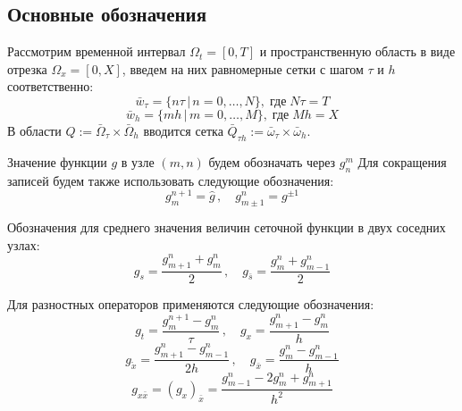 \subsection{Основные обозначения}
Рассмотрим временной интервал $\Omega_t = [0,T]$ и пространственную область в виде отрезка $\Omega_x = [0, X]$, введем на них равномерные сетки с шагом $\tau$ и $h$ соответственно:
$$ \bar w_{\tau} = \{n \tau \,|\, n = 0,\dots,N\}, \;\text{где}\; N \tau = T $$
$$ \bar w_{h} = \{mh \,|\, m = 0,\dots,M\}, \;\text{где}\; Mh = X $$
В области $ Q := \bar \Omega_{\tau} \times \bar \Omega_{h} $ 
вводится сетка $ \bar Q_{\tau h} := \bar \omega_{\tau} \times \bar \omega_{h} $.


Значение функции $g$ в узле $(m, n)$ будем обозначать через $g_{n}^{m}$
Для сокращения записей будем также использовать следующие обозначения:\label{obozn}
$$ 
  g_{m}^{n+1} = \hat g 
  \,,\quad 
  g_{m \pm 1}^{n} = g^{\pm 1} 
$$

Обозначения для среднего значения величин сеточной функции в двух соседних узлах:
$$
  g_{s} = \frac{g_{m+1}^{n} + g_{m}^{n}}{2}
  \,,\quad
  g_{\bar s} = \frac {g_{m}^{n} + g_{m-1}^{n}}{2}
$$

Для разностных операторов применяются следующие обозначения:
$$
  g_{t}=\frac{g_{m}^{n+1}-g_{m}^{n}}{\tau}
  \,,\quad
  g_{x}=\frac{g_{m+1}^{n}-g_{m}^{n}}{h}
$$
$$
  g_{\mathring{x}} = \frac{g^n_{m + 1} - g^n_{m - 1}}{2 h}
  \,,\quad
  g_{\bar{x}}=\frac{g_{m}^{n}-g_{m-1}^{n}}{h}
$$
$$
  g_{x \bar{x}}= (g_{x})_{\bar{x}} 
  = \frac{g_{m-1}^{n}-2 g_{m}^{n}+g_{m+1}^{n}}{h^{2}}
$$

\newpage